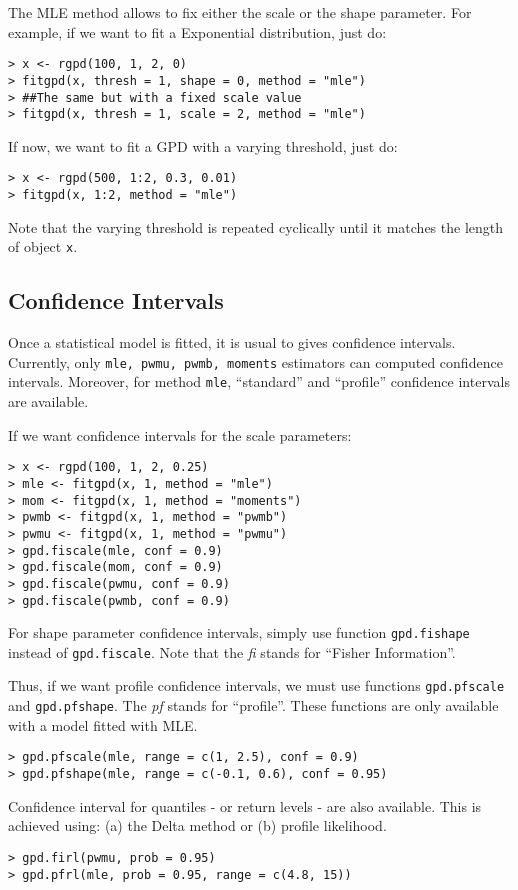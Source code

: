 \documentclass[11pt,a4paper]{article}
\numberwithin{equation}{section}
\begin{document}
The MLE method allows to fix either the scale or the shape
parameter. For example, if we want to fit a Exponential distribution,
just do:
\begin{verbatim}
> x <- rgpd(100, 1, 2, 0)
> fitgpd(x, thresh = 1, shape = 0, method = "mle")
> ##The same but with a fixed scale value
> fitgpd(x, thresh = 1, scale = 2, method = "mle")
\end{verbatim}
If now, we want to fit a GPD with a varying threshold, just do:
\begin{verbatim}
> x <- rgpd(500, 1:2, 0.3, 0.01)
> fitgpd(x, 1:2, method = "mle")
\end{verbatim}

Note that the varying threshold is repeated cyclically until it
matches the length of object \verb|x|.
 
\subsection{Confidence Intervals}
\label{subsec:confInt}

Once a statistical model is fitted, it is usual to gives confidence
intervals. Currently, only \verb|mle, pwmu, pwmb, moments| estimators
can computed confidence intervals. Moreover, for method \verb|mle|,
``standard'' and ``profile'' confidence intervals are available.

If we want confidence intervals for the scale parameters:
\begin{verbatim}
> x <- rgpd(100, 1, 2, 0.25)
> mle <- fitgpd(x, 1, method = "mle")
> mom <- fitgpd(x, 1, method = "moments")
> pwmb <- fitgpd(x, 1, method = "pwmb")
> pwmu <- fitgpd(x, 1, method = "pwmu")
> gpd.fiscale(mle, conf = 0.9)
> gpd.fiscale(mom, conf = 0.9)
> gpd.fiscale(pwmu, conf = 0.9)
> gpd.fiscale(pwmb, conf = 0.9)
\end{verbatim}
For shape parameter confidence intervals, simply use function
\verb|gpd.fishape| instead of \verb|gpd.fiscale|. Note that the
\emph{fi} stands for ``Fisher Information''.

Thus, if we want profile confidence intervals, we must use functions
\verb|gpd.pfscale| and \verb|gpd.pfshape|. The \emph{pf} stands for
``profile''. These functions are only available with a model fitted
with MLE.
\begin{verbatim}
> gpd.pfscale(mle, range = c(1, 2.5), conf = 0.9)
> gpd.pfshape(mle, range = c(-0.1, 0.6), conf = 0.95)
\end{verbatim}

Confidence interval for quantiles - or return levels - are also
available. This is achieved using: (a) the Delta method or (b) profile
likelihood.
\begin{verbatim}
> gpd.firl(pwmu, prob = 0.95)
> gpd.pfrl(mle, prob = 0.95, range = c(4.8, 15))
\end{verbatim}
\end{document}
